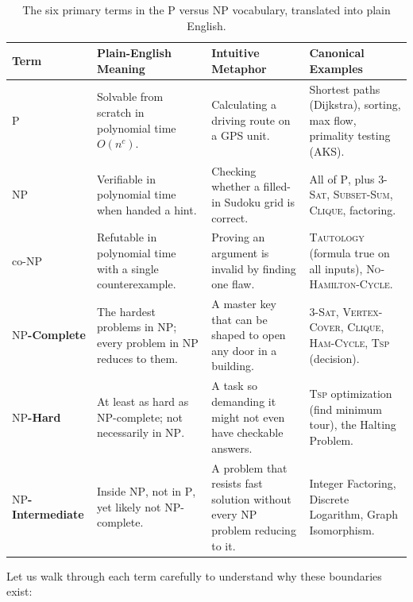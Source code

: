 \begin{table}[htbp]
\centering
\small
\renewcommand{\arraystretch}{1.25}
\begin{tabular}{>{\bfseries}p{2.3cm} p{4.1cm} p{4.1cm} p{4.2cm}}
\toprule
Term & Plain-English Meaning & Intuitive Metaphor & Canonical Examples \\
\midrule
$\mathrm{P}$ &
Solvable from scratch in polynomial time $O(n^c)$. &
Calculating a driving route on a GPS unit. &
Shortest paths (Dijkstra), sorting, max flow, primality testing (AKS). \\

$\mathrm{NP}$ &
Verifiable in polynomial time when handed a hint. &
Checking whether a filled-in Sudoku grid is correct. &
All of $\mathrm{P}$, plus \textsc{3-Sat}, \textsc{Subset-Sum}, \textsc{Clique}, factoring. \\

$\mathrm{co\text{-}NP}$ &
Refutable in polynomial time with a single counterexample. &
Proving an argument is invalid by finding one flaw. &
\textsc{Tautology} (formula true on all inputs), \textsc{No-Hamilton-Cycle}. \\

$\mathrm{NP}$-Complete &
The hardest problems in $\mathrm{NP}$; every problem in $\mathrm{NP}$ reduces to them. &
A master key that can be shaped to open any door in a building. &
\textsc{3-Sat}, \textsc{Vertex-Cover}, \textsc{Clique}, \textsc{Ham-Cycle}, \textsc{Tsp} (decision). \\

$\mathrm{NP}$-Hard &
At least as hard as $\mathrm{NP}$-complete; not necessarily in $\mathrm{NP}$. &
A task so demanding it might not even have checkable answers. &
\textsc{Tsp} optimization (find minimum tour), the Halting Problem. \\

$\mathrm{NP}$-Intermediate &
Inside $\mathrm{NP}$, not in $\mathrm{P}$, yet likely not $\mathrm{NP}$-complete. &
A problem that resists fast solution without every $\mathrm{NP}$ problem reducing to it. &
Integer Factoring, Discrete Logarithm, Graph Isomorphism. \\
\bottomrule
\end{tabular}
\caption{The six primary terms in the $\mathrm{P}$ versus $\mathrm{NP}$ vocabulary, translated into plain English.}
\label{ch33:tab-complexity-classes}
\end{table}

Let us walk through each term carefully to understand why these boundaries exist:

